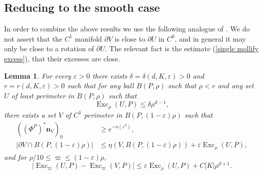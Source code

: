 \documentclass[final,12pt, leqno]{brownthesis}
\DeclareMathOperator{\Exc}{Exc}
\newcommand{\normal}{\mathbf n}
\newtheorem{lemma}[theorem]{Lemma}
\theoremstyle{definition}
\numberwithin{equation}{section}
\begin{document}
\subsection{Reducing to the smooth case}
In order to combine the above results we use the following analogue of \cite[Lemma 7.5]{Giusti77}.
We do not assert that the $C^1$ manifold $\partial V$ is close to $\partial U$ in $C^0$, and in general it may only be close to a rotation of $\partial U$. The relevant fact is the estimate (\ref{single mollify excess}), that their excesses are close.

\begin{lemma}\label{single mollify}
For every $\varepsilon > 0$ there exists $\delta = \delta(d, K, \varepsilon) > 0$ and $r = r(d, K, \varepsilon) > 0$ such that for any ball $B(P, \rho)$ such that $\rho < r$ and any set $U$ of least perimeter in $B(P, \rho)$ such that
$$\Exc_\rho (U, P) \leq \delta \rho^{d - 1},$$
there exists a set $V$ of $C^1$ perimeter in $B(P, (1 - \varepsilon)\rho)$ such that
\begin{align}
((\Phi^P)^* \normal_V)_0 &\geq e^{-o(\varepsilon^2)}, \label{single mollify normal}\\
|\partial V \cap B(P, (1 - \varepsilon)\rho)| &\leq \eta(V, B(P, (1 - \varepsilon)\rho)) + \varepsilon \Exc_\rho (U, P), \label{single mollify minimality}
\end{align}
and for $\rho/10 \leq \varpi \leq (1 - \varepsilon)\rho$,
\begin{equation}
|\Exc_\varpi (U, P) - \Exc_\varpi (V, P)| \leq \varepsilon \Exc_\rho (U, P) + C|K| \rho^{d + 1}. \label{single mollify excess}
\end{equation}
\end{lemma}
\end{document}
